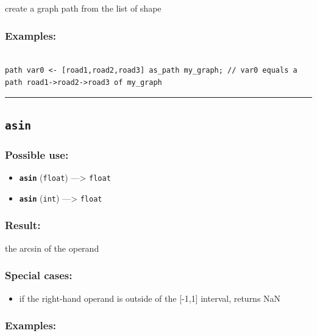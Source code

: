 \documentclass[]{book}
\providecommand{\tightlist}{%
  \setlength{\itemsep}{0pt}\setlength{\parskip}{0pt}}
\theoremstyle{definition}
\theoremstyle{definition}
\theoremstyle{definition}
\theoremstyle{remark}
\begin{document}
create a graph path from the list of shape

\subsubsection{Examples:}\label{examples-44}

\begin{verbatim}
 
path var0 <- [road1,road2,road3] as_path my_graph; // var0 equals a path road1->road2->road3 of my_graph
\end{verbatim}

\begin{center}\rule{0.5\linewidth}{\linethickness}\end{center}

\subsection{\texorpdfstring{\texttt{asin}}{asin}}\label{asin}

\subsubsection{Possible use:}\label{possible-use-55}

\begin{itemize}
\tightlist
\item
  \textbf{\texttt{asin}} (\texttt{float}) ---\textgreater{}
  \texttt{float}
\item
  \textbf{\texttt{asin}} (\texttt{int}) ---\textgreater{} \texttt{float}
\end{itemize}

\subsubsection{Result:}\label{result-54}

the arcsin of the operand

\subsubsection{Special cases:}\label{special-cases-22}

\begin{itemize}
\tightlist
\item
  if the right-hand operand is outside of the {[}-1,1{]} interval,
  returns NaN
\end{itemize}

\subsubsection{Examples:}\label{examples-45}
\end{document}

